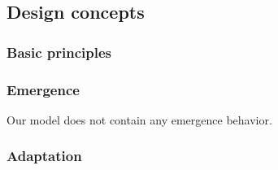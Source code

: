 \documentclass{article}[12pt]
\begin{document}



\subsection{Design concepts}

\subsubsection{Basic principles}\label{sec:bp}


\subsubsection{Emergence}

Our model does not contain any emergence behavior.

\subsubsection{Adaptation}
\end{document}
